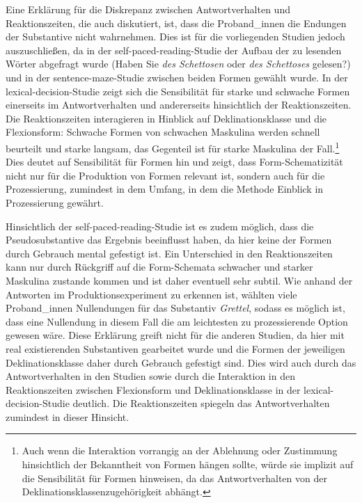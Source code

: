Eine Erklärung für die Diskrepanz zwischen Antwortverhalten und Reaktionszeiten, die auch \textcite[171--172]{Schmitt.2019} diskutiert, ist, dass die Pro\-\mbox{band\_in}\-nen die Endungen der Substantive nicht wahrnehmen. Dies ist für die vorliegenden Studien jedoch auszuschließen, da in der self-paced-reading-Studie der Aufbau der zu lesenden Wörter abgefragt wurde (Haben Sie \textit{des Schettosen} oder \textit{des Schettoses} gelesen?) und in der sentence-maze-Studie zwischen beiden Formen gewählt wurde. In der lexical-decision-Studie zeigt sich die Sensibilität für starke und schwache Formen einerseits im Antwortverhalten und andererseits hinsichtlich der Reaktionszeiten. Die Reaktionszeiten interagieren in Hinblick auf Deklinationsklasse und die Flexionsform: Schwache Formen von schwachen Maskulina werden schnell beurteilt und starke langsam, das Gegenteil ist für starke Maskulina der Fall.\footnote{Auch wenn die Interaktion vorrangig an der Ablehnung oder Zustimmung hinsichtlich der Bekanntheit von Formen hängen sollte, würde sie implizit auf die Sensibilität für Formen hinweisen, da das Antwortverhalten von der Deklinationsklassenzugehörigkeit abhängt.} Dies deutet auf Sensibilität für Formen hin und zeigt, dass Form-Schematizität nicht nur für die Produktion von Formen relevant ist, sondern auch für die Prozessierung, zumindest in dem Umfang, in dem die Methode Einblick in Prozessierung gewährt. 



Hinsichtlich der self-paced-reading-Studie ist es zudem möglich, dass die Pseudosubstantive das Ergebnis beeinflusst haben, da hier keine der Formen durch Gebrauch mental gefestigt ist. Ein Unterschied in den Reaktionszeiten kann nur durch Rückgriff auf die Form-Schemata schwacher und starker Maskulina zustande kommen und ist daher eventuell sehr subtil. Wie anhand der Antworten im Produktionsexperiment zu erkennen ist, wählten viele Proband\_innen Nullendungen für das Substantiv \textit{Grettel}, sodass es möglich ist, dass eine Nullendung in diesem Fall die am leichtesten zu prozessierende Option gewesen wäre. Diese Erklärung greift nicht für die anderen Studien, da hier mit real existierenden Substantiven gearbeitet wurde und die Formen der jeweiligen Deklinationsklasse daher durch Gebrauch gefestigt sind. Dies wird auch durch das Antwortverhalten in den Studien sowie durch die Interaktion in den Reaktionszeiten zwischen Flexionsform und Deklinationsklasse in der lexical-decision-Studie deutlich. Die Reaktionszeiten spiegeln das Antwortverhalten zumindest in dieser Hinsicht.

